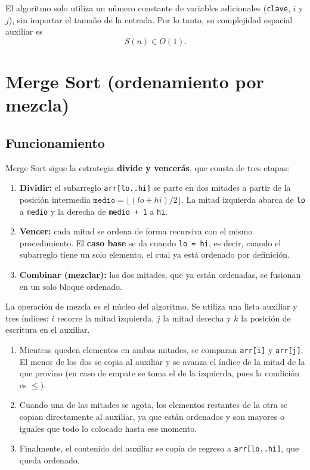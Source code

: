 El algoritmo solo utiliza un número constante de variables adicionales (\texttt{clave}, $i$ y $j$), sin importar el tamaño de la entrada. Por lo tanto, su complejidad espacial auxiliar es
\[
  S(n) \in O(1).
\]

\newpage

\section{Merge Sort (ordenamiento por mezcla)}

\subsection{Funcionamiento}

Merge Sort sigue la estrategia \textbf{divide y vencerás}, que consta de tres etapas:

\begin{enumerate}
  \item \textbf{Dividir:} el subarreglo \texttt{arr[lo..hi]} se parte en dos mitades a partir de la posición intermedia $\texttt{medio} = \lfloor (lo + hi)/2 \rfloor$. La mitad izquierda abarca de \texttt{lo} a \texttt{medio} y la derecha de \texttt{medio + 1} a \texttt{hi}.
  \item \textbf{Vencer:} cada mitad se ordena de forma recursiva con el mismo procedimiento. El \textbf{caso base} se da cuando \texttt{lo = hi}, es decir, cuando el subarreglo tiene un solo elemento, el cual ya está ordenado por definición.
  \item \textbf{Combinar (mezclar):} las dos mitades, que ya están ordenadas, se fusionan en un solo bloque ordenado.
\end{enumerate}

La operación de mezcla es el núcleo del algoritmo. Se utiliza una lista auxiliar y tres índices: $i$ recorre la mitad izquierda, $j$ la mitad derecha y $k$ la posición de escritura en el auxiliar.

\begin{enumerate}
  \item Mientras queden elementos en ambas mitades, se comparan \texttt{arr[i]} y \texttt{arr[j]}. El menor de los dos se copia al auxiliar y se avanza el índice de la mitad de la que provino (en caso de empate se toma el de la izquierda, pues la condición es $\leq$).
  \item Cuando una de las mitades se agota, los elementos restantes de la otra se copian directamente al auxiliar, ya que están ordenados y son mayores o iguales que todo lo colocado hasta ese momento.
  \item Finalmente, el contenido del auxiliar se copia de regreso a \texttt{arr[lo..hi]}, que queda ordenado.
\end{enumerate}

